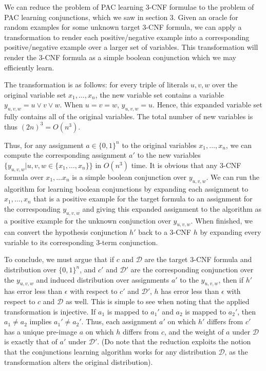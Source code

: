 \documentclass{article}
\begin{document}
We can reduce the problem of PAC learning 3-CNF formulae to the problem of PAC
learning conjunctions, which we saw in section $3$. Given an oracle for random
examples for some unknown target $3$-CNF formula, we can apply a transformation
to render each positive/negative example into a corresponding positive/negative
example over a larger set of variables. This transformation will render the
$3$-CNF formula as a simple boolean conjunction which we may efficiently
learn.

The transformation is as follows: for every triple of literals $u, v, w$ over
the original variable set $x_1, \dots, x_n$, the new variable set contains a
variable $y_{u,v,w} = u \vee v \vee w$. When $u = v = w$, $y_{u,v,w} = u$.
Hence, this expanded variable set fully contains all of the original variables.
The total number of new variables is thus $(2n)^3 = O(n^3)$.

Thus, for any assignment $a \in \{0, 1\}^n$ to the original variables
$x_1, \dots, x_n$, we can compute the corresponding assignment $a'$ to the new
variables $\big\{y_{u,v,w} | u, v, w \in \{x_1, \dots, x_n\}\big\}$ in $O(n^3)$
time. It is obvious that any 3-CNF formula over $x_1, \dots x_n$ is a simple
boolean conjunction over $y_{u, v, w}$. We can run the algorithm for learning
boolean conjunctions by expanding each assignment to $x_1, \dots, x_n$ that is a
positive example for the target formula to an assignment for the corresponding
$y_{u,v,w}$ and giving this expanded assignment to the algorithm as a positive
example for the unknown conjunction over $y_{u, v, w}$. When finished, we can
convert the hypothesis conjunction $h'$ back to a 3-CNF $h$ by expanding every
variable to its corresponding 3-term conjunction.

To conclude, we must argue that if $c$ and $\mathcal{D}$ are the target 3-CNF
formula and distribution over $\{0, 1\}^n$, and $c'$ and $\mathcal{D}'$ are the
corresponding conjunction over the $y_{u,v,w}$ and induced distribution over
assignments $a'$ to the $y_{u,v,w}$, then if $h'$ has error less than $\epsilon$
with respect to $c'$ and $\mathcal{D}'$, $h$ has error less than $\epsilon$ with
respect to $c$ and $\mathcal{D}$ as well. This is simple to see when noting that
the
applied transformation is injective. If $a_1$ is mapped to $a_1'$ and $a_2$ is
mapped to $a_2'$, then $a_1 \neq a_2$ implies $a_1' \neq a_2'$. Thus, each
assignment $a'$ on which $h'$ differs from $c'$ has a unique pre-image $a$ on
which $h$ differs from $c$, and the weight of $a$ under $\mathcal{D}$ is exactly
that of $a'$ under $\mathcal{D}'$. (Do note that the reduction exploits the
notion that the conjunctions learning algorithm works for any distribution
$\mathcal{D}$, as the transformation alters the original distribution).
\end{document}
